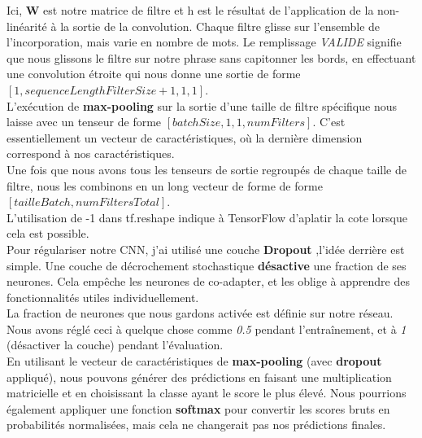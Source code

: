 Ici, \textbf{W} est notre matrice de filtre et h est le résultat de l'application de la non-linéarité à la sortie de la convolution. Chaque filtre glisse sur l'ensemble de l'incorporation, mais varie en nombre de mots. Le remplissage \textit{VALIDE} signifie que nous glissons le filtre sur notre phrase sans capitonner les bords, en effectuant une convolution étroite qui nous donne une sortie de forme $ [1, sequenceLengthFilterSize+1, 1, 1] $.\\[0.2cm]
 L'exécution de \textbf{max-pooling} sur la sortie d'une taille de filtre spécifique nous laisse avec un tenseur de forme $ [batchSize, 1, 1, numFilters] $. C'est essentiellement un vecteur de caractéristiques, où la dernière dimension correspond à nos caractéristiques.\\[0.2cm]
Une fois que nous avons tous les tenseurs de sortie regroupés de chaque taille de filtre, nous les combinons en un long vecteur de forme de forme $ [tailleBatch, numFiltersTotal] $. \\[0.2cm]
L'utilisation de -1 dans tf.reshape indique à TensorFlow d'aplatir la cote lorsque cela est possible.\\[0.2cm]

Pour régulariser notre CNN, j’ai utilisé une couche \textbf{Dropout} ,l'idée derrière  est simple. Une couche de décrochement stochastique \textbf{désactive} une fraction de ses neurones. Cela empêche les neurones de co-adapter, et les oblige à apprendre des fonctionnalités utiles individuellement.\\[0.2cm]
 La fraction de neurones que nous gardons activée est définie sur notre réseau. Nous avons réglé ceci à quelque chose comme \textit{0.5} pendant l'entraînement, et à \textit{1} (désactiver la couche) pendant l'évaluation.\\[0.2cm]
 
 En utilisant le vecteur de caractéristiques de \textbf{max-pooling} (avec \textbf{dropout} appliqué), nous pouvons générer des prédictions en faisant une multiplication matricielle et en choisissant la classe ayant le score le plus élevé. Nous pourrions également appliquer une fonction \textbf{softmax} pour convertir les scores bruts en probabilités normalisées, mais cela ne changerait pas nos prédictions finales.\\[0.2cm]
 
